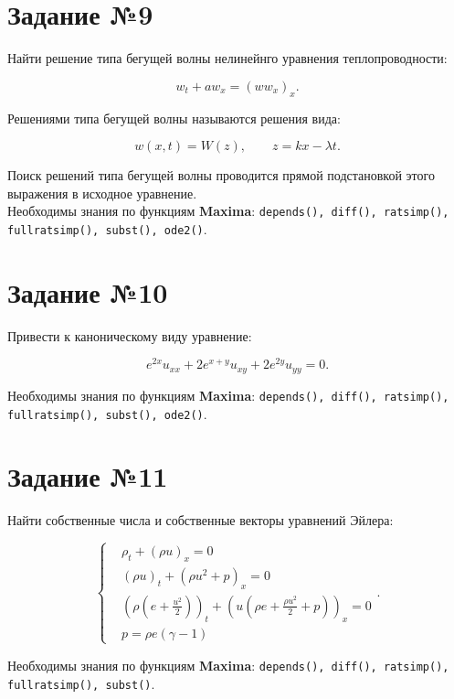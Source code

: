 \section*{Задание №9}

    Найти решение типа бегущей волны нелинейнго уравнения теплопроводности: 

    \[
        w_{t} + a w_{x} =  \left( w w_{x} \right)_{x}.
    \]

    Решениями типа бегущей волны называются решения вида:

    \[
        w(x, t) = W(z), \qquad z = k x - \lambda t.
    \]

    Поиск решений типа бегущей волны проводится прямой подстановкой этого выражения в исходное уравнение.\\

    Необходимы знания по функциям \textbf{Maxima}: {\tt depends(), diff(), ratsimp(), fullratsimp(), subst(), ode2()}.

\section*{Задание №10}

	Привести к каноническому виду уравнение:

	\[
		e^{2 x} u_{xx} + 2 e^{x + y} u_{xy} + 2 e^{2 y} u_{yy} = 0.
	\]

	Необходимы знания по функциям \textbf{Maxima}: {\tt depends(), diff(), ratsimp(), fullratsimp(), subst(), ode2()}.

\section*{Задание №11}

	Найти собственные числа и собственные векторы уравнений Эйлера:
	
	\begin{equation}
		\begin{cases}
			& \rho_{t} + \left( \rho u \right)_{x} = 0 \\
			& \left( \rho u \right)_{t} + \left( \rho u^{2} + p \right)_{x} = 0 \\
			& \left( \rho \left( e + \frac{u^{2}}{2} \right) \right)_{t} + \left( u \left( \rho e + \frac{\rho u^{2}}{2} + p \right) \right)_{x} = 0 \\
			& p = \rho e \left( \gamma - 1 \right)
		\end{cases}.
	\end{equation}
	
	Необходимы знания по функциям \textbf{Maxima}: {\tt depends(), diff(), ratsimp(), fullratsimp(), subst()}.

    \newpage